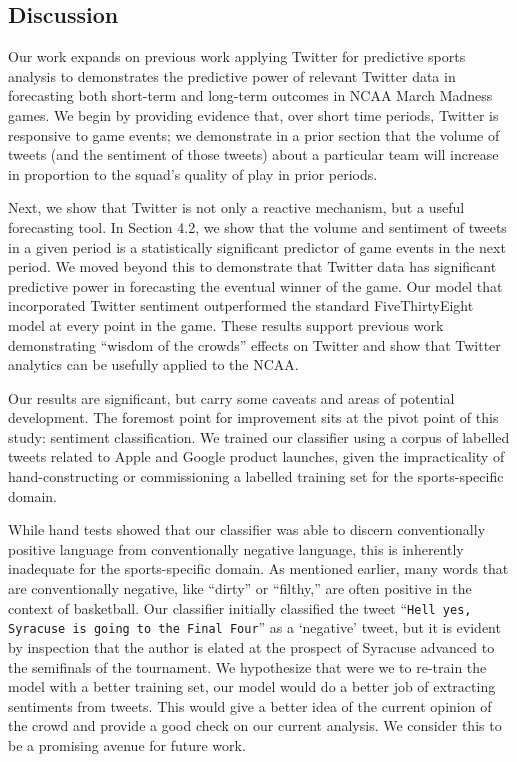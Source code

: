\documentclass[12pt]{article}
\begin{document}
\begin{doublespacing}
\section{Discussion}

Our work expands on previous work applying Twitter for predictive sports analysis to demonstrates the predictive power of relevant Twitter data in forecasting both short-term and long-term outcomes in NCAA March Madness games. We begin by providing evidence that, over short time periods, Twitter is responsive to game events; we demonstrate in a prior section that the volume of tweets (and the sentiment of those tweets) about a particular team will increase in proportion to the squad's quality of play in prior periods.

Next, we show that Twitter is not only a reactive mechanism, but a useful forecasting tool. In Section 4.2, we show that the volume and sentiment of tweets in a given period is a statistically significant predictor of game events in the next period. We moved beyond this to demonstrate that Twitter data has significant predictive power in forecasting the eventual winner of the game. Our model that incorporated Twitter sentiment outperformed the standard FiveThirtyEight model at every point in the game. These results support previous work demonstrating ``wisdom of the crowds'' effects on Twitter and show that Twitter analytics can be usefully applied to the NCAA. 

Our results are significant, but carry some caveats and areas of potential development. The foremost point for improvement sits at the pivot point of this study: sentiment classification. We trained our classifier using a corpus of labelled tweets related to Apple and Google product launches, given the impracticality of hand-constructing or commissioning a labelled training set for the sports-specific domain. 

While hand tests showed that our classifier was able to discern conventionally positive language from conventionally negative language, this is inherently inadequate for the sports-specific domain. As mentioned earlier, many words that are conventionally negative, like ``dirty'' or ``filthy,'' are often positive in the context of basketball. Our classifier initially classified the tweet ``\texttt{Hell yes, Syracuse is going to the Final Four}'' as a `negative' tweet, but it is evident by inspection that the author is elated at the prospect of Syracuse advanced to the semifinals of the tournament. We hypothesize that were we to re-train the model with a better training set, our model would do a better job of extracting sentiments from tweets. This would give a better idea of the current opinion of the crowd and provide a good check on our current analysis. We consider this to be a promising avenue for future work.


\end{doublespacing}
\end{document}
